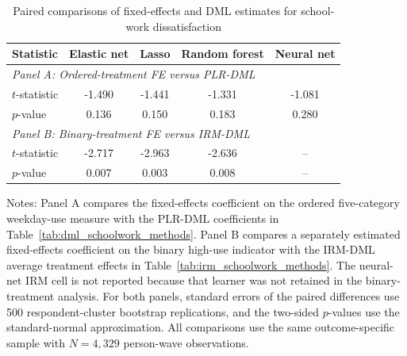 \begin{table}[!htbp]
\centering
\caption{Paired comparisons of fixed-effects and DML estimates for school-work dissatisfaction}
\label{tab:fe_dml_comparison_schoolwork_dissatisfaction}
\small
\setlength{\tabcolsep}{6pt}
\begin{tabular}{lcccc}
\hline
Statistic & Elastic net & Lasso & Random forest & Neural net
\\
\hline
\multicolumn{5}{l}{\textit{Panel A: Ordered-treatment FE versus PLR-DML}} \\
$t$-statistic & -1.490 & -1.441 & -1.331 & -1.081
\\
$p$-value & 0.136 & 0.150 & 0.183 & 0.280
\\[0.4ex]
\multicolumn{5}{l}{\textit{Panel B: Binary-treatment FE versus IRM-DML}} \\
$t$-statistic & -2.717 & -2.963 & -2.636 & --
\\
$p$-value & 0.007 & 0.003 & 0.008 & --
\\
\hline
\end{tabular}
\begin{minipage}{0.96\textwidth}
\footnotesize Notes: Panel A compares the fixed-effects coefficient on the ordered five-category weekday-use measure with the PLR-DML coefficients in Table~\ref{tab:dml_schoolwork_methods}. Panel B compares a separately estimated fixed-effects coefficient on the binary high-use indicator with the IRM-DML average treatment effects in Table~\ref{tab:irm_schoolwork_methods}. The neural-net IRM cell is not reported because that learner was not retained in the binary-treatment analysis. For both panels, standard errors of the paired differences use 500 respondent-cluster bootstrap replications, and the two-sided $p$-values use the standard-normal approximation. All comparisons use the same outcome-specific sample with $N=4,329$ person-wave observations.
\end{minipage}
\end{table}
